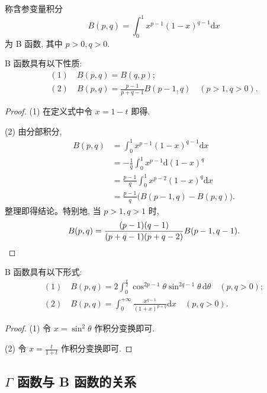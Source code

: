 \begin{definition}\label{definition:ma-17-3-2}
称含参变量积分
\[
  B(p,q)=\int_0^1x^{p-1}(1-x)^{q-1}\mathrm dx
\]
为 B 函数, 其中 $p>0,q>0$.
\end{definition}


\begin{property}\label{property:ma-17-3-5}
B 函数具有以下性质:
\[
\begin{gathered}
  (1)\quad B(p,q)=B(q,p);\\
  (2)\quad B(p,q)=\frac{p-1}{p+q-1}B(p-1,q)\quad(p>1,q>0).
\end{gathered}
\]
\end{property}


\begin{proof}
(1) 在定义式中令 $x=1-t$ 即得.

(2) 由分部积分,
\[
\begin{aligned}
  B(p,q)
  &=\int_0^1x^{p-1}(1-x)^{q-1}\mathrm dx\\
  &=-\frac1q\int_0^1x^{p-1}\mathrm d(1-x)^q\\
  &=\frac{p-1}{q}\int_0^1x^{p-2}(1-x)^q\mathrm dx\\
  &=\frac{p-1}{q}\bigl(B(p-1,q)-B(p,q)\bigr).
\end{aligned}
\]
整理即得结论。特别地, 当 $p>1,q>1$ 时,
\[
  B(p,q)=\frac{(p-1)(q-1)}{(p+q-1)(p+q-2)}B(p-1,q-1).
\qedhere
\]
\end{proof}


\begin{property}\label{property:ma-17-3-6}
B 函数具有以下形式:
\[
\begin{gathered}
  (1)\quad B(p,q)=2\int_0^{\frac\pi2}\cos^{2p-1}\theta\sin^{2q-1}\theta\,\mathrm d\theta\quad(p,q>0);\\
  (2)\quad B(p,q)=\int_0^{+\infty}\frac{x^{q-1}}{(1+x)^{p+q}}\mathrm dx\quad(p,q>0).
\end{gathered}
\]
\end{property}


\begin{proof}
(1) 令 $x=\sin^2\theta$ 作积分变换即可.

(2) 令 $x=\frac{t}{1+t}$ 作积分变换即可.
\end{proof}


\subsection{\texorpdfstring{$\Gamma$ 函数与 B 函数的关系}{Γ 函数与 B 函数的关系}}
\label{subsec:ma-17-3-3}

